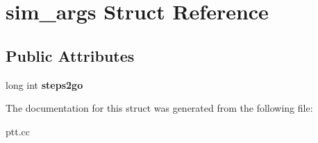 \hypertarget{structsim__args}{
\section{sim\_\-args Struct Reference}
\label{structsim__args}
}
\subsection*{Public Attributes}
\begin{DoxyCompactItemize}
\item 
\hypertarget{structsim__args_afcc2130fe3359fd70c3515b13b79918e}{
long int {\bfseries steps2go}}
\label{structsim__args_afcc2130fe3359fd70c3515b13b79918e}

\end{DoxyCompactItemize}


The documentation for this struct was generated from the following file:\begin{DoxyCompactItemize}
\item 
ptt.cc\end{DoxyCompactItemize}
